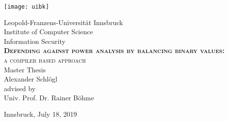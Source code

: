 \begin{titlepage}

    \begin{center}

        \texttt{[image: uibk]}

        \large Leopold-Franzens-Universit\"at Innsbruck\\
        [0.5cm]  

        \large Institute of Computer Science\\Information Security\\
        [3cm]

        \textsc{\large\textbf{Defending against power analysis by balancing binary values:}\\a compiler based approach}\\
        Master Thesis\\
        [2cm]

        Alexander Schlögl\\
        [3.5cm]

        advised by\\
        Univ. Prof. Dr. Rainer Böhme\\

        \vfill

        Innsbruck, July 18, 2019

    \end{center}

\end{titlepage}


